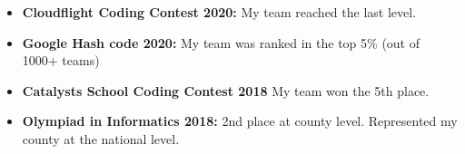 
\begin{itemize}

\item \textbf{Cloudflight Coding Contest 2020:} My team reached the last level.

\item \textbf{Google Hash code 2020:} My team was ranked in the top 5\% (out of 1000+ teams)

\item \textbf{Catalysts School Coding Contest 2018} My team won the 5th place.

\item \textbf{Olympiad in Informatics 2018:} 2nd place at county level. Represented my county at the national level.

\end{itemize} 

